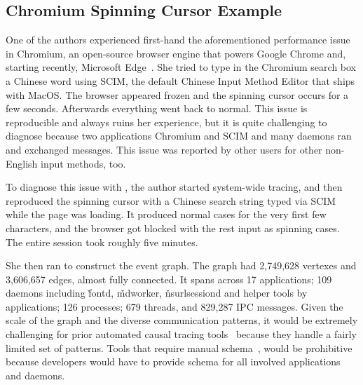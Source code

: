 \subsection{Chromium Spinning Cursor Example}


One of the authors experienced first-hand the aforementioned performance issue
in Chromium, an open-source browser engine that powers Google Chrome and,
starting recently, Microsoft Edge~\cite{chromiumurl}.  She tried to type in the
Chromium search box a Chinese word using SCIM, the default Chinese Input Method
Editor that ships with MacOS.  The browser appeared frozen and the spinning
cursor occurs for a few seconds.  Afterwards everything went back to normal.
This issue is reproducible and always ruins her experience, but it is quite
challenging to diagnose because two applications Chromium and SCIM and many
daemons ran and exchanged messages.  This issue was reported by other users for
other non-English input methods, too.

To diagnose this issue with \xxx, the author started system-wide tracing, and
then reproduced the spinning cursor with a Chinese search string typed via SCIM
while the page was loading. It produced normal cases for the very first few
characters, and the browser got blocked with the rest input as spinning cases.
The entire session took roughly five minutes.

She then ran \xxx to construct the event graph.  The graph had 2,749,628
vertexes and 3,606,657 edges, almost fully connected.  It spans across 17
applications; 109 daemons including \v{fontd}, \v{mdworker}, \v{nsurlsessiond}
and helper tools by applications; 126 processes; 679 threads, and 829,287 IPC
messages.  Given the scale of the graph and the diverse communication patterns,
it would be extremely challenging for prior automated causal tracing
tools~\cite{aguilera2003performance, zhang2013panappticon, attariyan2012x,
cohen2004correlating} because they handle a fairly limited set of patterns.
Tools that require manual schema~\cite{barham2004using, reynolds2006pip}, would
be prohibitive because developers would have to provide schema for all involved
applications and daemons.

